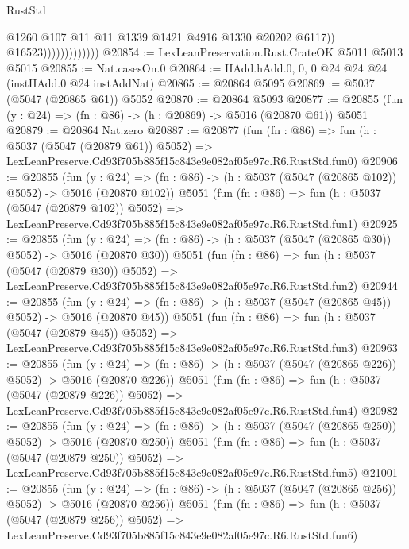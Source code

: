 \begin{lexlean}{RustStd}
\begin{coremodule}
                                  @1260
                                  @107
                                  @11
                                  @11
                                  @1339
                                  @1421
                                  @4916
                                  @1330
                                  @20202
                                  @6117))
                              @16523)))))))))))))
@20854 := LexLeanPreservation.Rust.CrateOK @5011 @5013 @5015
@20855 := Nat.casesOn.{0}
@20864 := HAdd.hAdd.{0, 0, 0} @24 @24 @24 (instHAdd.{0} @24 instAddNat)
@20865 := @20864 @5095
@20869 := @5037 (@5047 (@20865 @61)) @5052
@20870 := @20864 @5093
@20877 := @20855 (fun (y : @24) => (fn : @86) -> (h : @20869) -> @5016 (@20870 @61)) @5051
@20879 := @20864 Nat.zero
@20887 := @20877
    (fun (fn : @86) =>
    fun (h : @5037 (@5047 (@20879 @61)) @5052) =>
    LexLeanPreserve.Cd93f705b885f15c843e9e082af05e97c.R6.RustStd.fun0)
@20906 := @20855
    (fun (y : @24) => (fn : @86) -> (h : @5037 (@5047 (@20865 @102)) @5052) -> @5016 (@20870 @102))
    @5051
    (fun (fn : @86) =>
    fun (h : @5037 (@5047 (@20879 @102)) @5052) =>
    LexLeanPreserve.Cd93f705b885f15c843e9e082af05e97c.R6.RustStd.fun1)
@20925 := @20855
    (fun (y : @24) => (fn : @86) -> (h : @5037 (@5047 (@20865 @30)) @5052) -> @5016 (@20870 @30))
    @5051
    (fun (fn : @86) =>
    fun (h : @5037 (@5047 (@20879 @30)) @5052) =>
    LexLeanPreserve.Cd93f705b885f15c843e9e082af05e97c.R6.RustStd.fun2)
@20944 := @20855
    (fun (y : @24) => (fn : @86) -> (h : @5037 (@5047 (@20865 @45)) @5052) -> @5016 (@20870 @45))
    @5051
    (fun (fn : @86) =>
    fun (h : @5037 (@5047 (@20879 @45)) @5052) =>
    LexLeanPreserve.Cd93f705b885f15c843e9e082af05e97c.R6.RustStd.fun3)
@20963 := @20855
    (fun (y : @24) => (fn : @86) -> (h : @5037 (@5047 (@20865 @226)) @5052) -> @5016 (@20870 @226))
    @5051
    (fun (fn : @86) =>
    fun (h : @5037 (@5047 (@20879 @226)) @5052) =>
    LexLeanPreserve.Cd93f705b885f15c843e9e082af05e97c.R6.RustStd.fun4)
@20982 := @20855
    (fun (y : @24) => (fn : @86) -> (h : @5037 (@5047 (@20865 @250)) @5052) -> @5016 (@20870 @250))
    @5051
    (fun (fn : @86) =>
    fun (h : @5037 (@5047 (@20879 @250)) @5052) =>
    LexLeanPreserve.Cd93f705b885f15c843e9e082af05e97c.R6.RustStd.fun5)
@21001 := @20855
    (fun (y : @24) => (fn : @86) -> (h : @5037 (@5047 (@20865 @256)) @5052) -> @5016 (@20870 @256))
    @5051
    (fun (fn : @86) =>
    fun (h : @5037 (@5047 (@20879 @256)) @5052) =>
    LexLeanPreserve.Cd93f705b885f15c843e9e082af05e97c.R6.RustStd.fun6)

\end{coremodule}
\end{lexlean}
